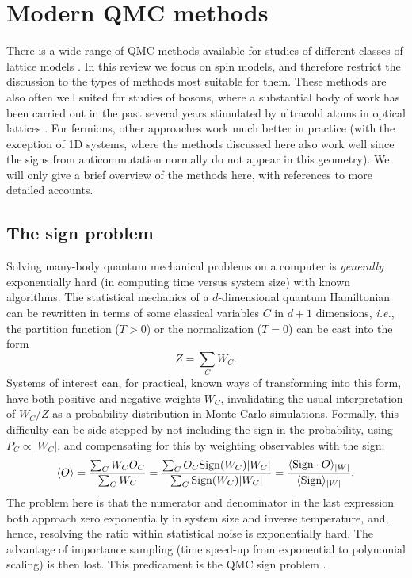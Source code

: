 \documentclass[range]{ar2e}
\begin{document}
\section{Modern QMC methods}
\label{sec:methods}

There is a wide range of QMC methods available for studies of different classes of lattice models \cite{Assaad07,Evertz03,Sandvik10b}. In this review we 
focus on spin models, and therefore restrict the discussion to the types of methods most suitable for them. These methods are also often well suited 
for studies of bosons, where a substantial body of work has been carried out in the past several years stimulated by ultracold atoms in optical 
lattices \cite{Kashurnikov02,Wessel04,Kato08,Pollet10}. For fermions, other approaches \cite{Hirsch82,Assaad07} work much better in practice (with
the exception of 1D systems, where the methods discussed here also work well since the signs from anticommutation normally do not appear in this geometry). 
We will only give a brief overview of the methods here, with references to more detailed accounts.

\subsection{The sign problem}
\label{ss:sign}

Solving many-body quantum mechanical problems on a computer is {\em generally} exponentially hard (in computing time versus system size) 
with known algorithms. The statistical mechanics of a $d$-dimensional quantum Hamiltonian can be rewritten in terms of some classical variables 
$C$ in $d+1$ dimensions, {\em i.e.}, the partition function ($T>0$) or the normalization ($T=0$) can be cast into the form
\begin{equation}
\label{eq:wc}
Z=\sum_C W_C.
\end{equation}
Systems of interest can, for practical, known ways of transforming into this form, have both positive and negative weights $W_C$, 
invalidating the usual interpretation of $W_C/Z$ as a probability distribution in Monte Carlo simulations. Formally, this difficulty 
can be side-stepped by not including the sign in the probability, using $P_C \propto |W_C|$, and compensating for this by weighting 
observables with the sign;
\begin{equation}
\langle O \rangle = \frac{\sum_C W_C O_C}{\sum_C W_C} =
\frac{\sum_C O_C {\rm Sign}(W_C) |W_C|}{\sum_C {\rm Sign}(W_C)|W_C|} = 
\frac{\langle {\rm Sign} \cdot O\rangle_{|W|}}{\langle {\rm Sign}\rangle_{|W|}}.
\label{expvalue}
\end{equation}
The problem here is that the numerator and denominator in the last expression both approach zero
exponentially in system size and inverse temperature, and, hence, resolving the ratio within 
statistical noise is exponentially hard. The advantage of importance sampling (time speed-up from exponential 
to polynomial scaling) is then lost. This predicament is the QMC sign problem \cite{Loh90,Henelius00,Nyfeler08}.
\end{document}
